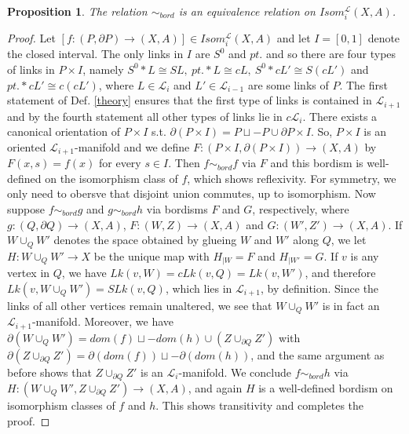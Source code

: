 \documentclass[11pt]{book}
\newtheorem{prop}{Proposition}
\begin{document}
\begin{prop}
The relation $\sim_{bord} $ is an equivalence relation on $Isom_{i}^{\mathcal{L}}(X,A)$.
\end{prop}

\begin{proof}
Let $[f: (P, \partial P) \to (X,A)] \in Isom_{i}^{\mathcal{L}}(X,A)$ and let $I=[0,1]$ denote the closed interval. The only links in $I$ are $S^0$ and $pt.$ and so there are four types of links in $P \times I$, namely $S^0 * L \cong SL,\  pt. * L \cong cL,\  S^0 * cL' \cong S(cL')$ and $pt. * cL' \cong c(cL')$, where $L \in \mathcal{L}_i$ and $L' \in \mathcal{L}_{i-1}$ are some links of $P$. The first statement of Def. \ref{theory} ensures that the first type of links is contained in $\mathcal{L}_{i+1}$ and by the fourth statement all other types of links lie in $c \mathcal{L}_i$. There exists a canonical orientation of $P \times I$ s.t. $\partial (P \times I)= P \sqcup -P \cup \partial P \times I$. So, $P \times I$ is an oriented $\mathcal{L}_{i+1}$-manifold and we define $F: (P \times I, \partial(P \times I)) \to (X,A)$ by $F(x,s)=f(x)$ for every $s \in I$. Then $f \sim_{bord} f$ via $F$ and this bordism is well-defined on the isomorphism class of $f$, which shows reflexivity. For symmetry, we only need to obersve that disjoint union commutes, up to isomorphism. Now suppose $f \sim_{bord} g$ and $g \sim_{bord} h$ via bordisms $F$ and $G$, respectively, where $g: (Q, \partial Q) \to (X,A)$, $F: (W,Z) \to (X,A)$ and $G: (W',Z') \to (X,A)$. If $W \cup_{Q} W'$ denotes the space obtained by glueing $W$ and $W'$ along $Q$, we let $H: W \cup_{Q} W' \to X$ be the unique map with $H_{|W} = F$ and $H_{|W'}=G$. If $v$ is any vertex in $Q$, we have $Lk(v,W)=cLk(v,Q)=Lk(v,W')$, and therefore $Lk(v,W \cup_{Q} W') = SLk(v,Q)$, which lies in $\mathcal{L}_{i+1}$, by definition. Since the links of all other vertices remain unaltered, we see that $W \cup_{Q} W'$ is in fact an $\mathcal{L}_{i+1}$-manifold. Moreover, we have $\partial (W \cup_{Q} W')= dom(f) \sqcup -dom(h) \cup (Z \cup_{\partial Q} Z')$ with $\partial (Z \cup_{\partial Q} Z')= \partial (dom(f)) \sqcup - \partial (dom(h))$, and the same argument as before shows that $Z \cup_{\partial Q} Z'$ is an $\mathcal{L}_i$-manifold. We conclude $f \sim_{bord} h$ via $H: (W \cup_{Q} W',Z \cup_{\partial Q} Z') \to (X,A)$, and again $H$ is a well-defined bordism on isomorphism classes of $f$ and $h$. This shows transitivity and completes the proof.
\end{proof}
\end{document}
